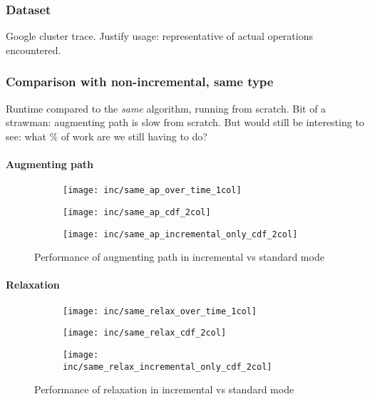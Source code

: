 \subsubsection{Dataset}

Google cluster trace. Justify usage: representative of actual operations encountered.

\subsubsection{Comparison with non-incremental, same type}

Runtime compared to the {\it same} algorithm, running from scratch. Bit of a strawman: augmenting path is slow from scratch. But would still be interesting to see: what \% of work are we still having to do?

\paragraph{Augmenting path}

\begin{figure}
    \begin{widepage}
    \begin{subfigure}[c]{\textwidth}
        \texttt{[image: inc/same\_ap\_over\_time\_1col]}
    \end{subfigure}
    \begin{subfigure}[c]{0.5\textwidth}
        \texttt{[image: inc/same\_ap\_cdf\_2col]}
    \end{subfigure}
   \begin{subfigure}[c]{0.5\textwidth}
       \texttt{[image: inc/same\_ap\_incremental\_only\_cdf\_2col]}
    \end{subfigure}
    \end{widepage}
    \caption{Performance of augmenting path in incremental vs standard mode}
    \label{fig:inc-same-ap}
\end{figure}

\paragraph{Relaxation}

\begin{figure}
    \begin{widepage} 
    \begin{subfigure}[c]{\textwidth}
        \texttt{[image: inc/same\_relax\_over\_time\_1col]}
    \end{subfigure}
    \begin{subfigure}[c]{0.5\textwidth}
        \texttt{[image: inc/same\_relax\_cdf\_2col]}
    \end{subfigure}
    \begin{subfigure}[c]{0.5\textwidth}
        \texttt{[image: inc/same\_relax\_incremental\_only\_cdf\_2col]}
    \end{subfigure}
    \end{widepage}
    \caption{Performance of relaxation in incremental vs standard mode}
    \label{fig:inc-same-relax}
\end{figure}

